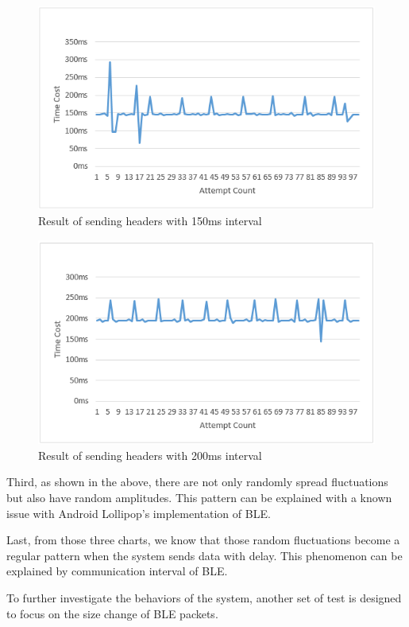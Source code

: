 \documentclass{Nan_Thesis}
\begin{document}
\begin{figure}[H]
  \centering 
      \includegraphics[scale=1]{pic/experiment1result2.png} 
  \caption{Result of sending headers with 150ms interval}
\end{figure}

\begin{figure}[H]
  \centering 
      \includegraphics[scale=1]{pic/experiment1result3.png} 
  \caption{Result of sending headers with 200ms interval}
\end{figure}

Third, as shown in the above, there are not only randomly spread fluctuations but also have random amplitudes. This pattern can be explained with a known issue with Android Lollipop’s implementation of BLE.

Last, from those three charts, we know that those random fluctuations become a regular pattern when the system sends data with delay. This phenomenon can be explained by communication interval of BLE.

To further investigate the behaviors of the system, another set of test is designed to focus on the size change of BLE packets.
\end{document}
